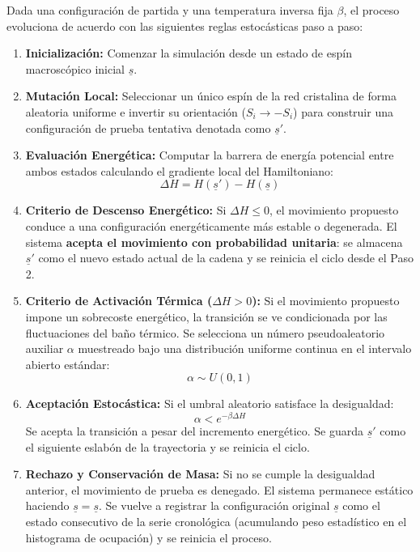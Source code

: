 \begin{teo}
Dada una configuración de partida y una temperatura inversa fija $\beta$, el proceso evoluciona de acuerdo con las siguientes reglas estocásticas paso a paso:
\begin{enumerate}
    \item[\textbf{\color{red}1)}] \textbf{Inicialización:} Comenzar la simulación desde un estado de espín macroscópico inicial $\underline{s}$.
    
    \item[\textbf{\color{red}2)}] \textbf{Mutación Local:} Seleccionar un único espín de la red cristalina de forma aleatoria uniforme e invertir su orientación ($S_i \to -S_i$) para construir una configuración de prueba tentativa denotada como $\underline{s}'$.
    
    \item[\textbf{\color{red}3)}] \textbf{Evaluación Energética:} Computar la barrera de energía potencial entre ambos estados calculando el gradiente local del Hamiltoniano:
    \[
    \Delta H = H(\underline{s}') - H(\underline{s})
    \]
    
    \item[\textbf{\color{red}4)}] \textbf{Criterio de Descenso Energético:} Si $\Delta H \le 0$, el movimiento propuesto conduce a una configuración energéticamente más estable o degenerada. El sistema \textbf{acepta el movimiento con probabilidad unitaria}: se almacena $\underline{s}'$ como el nuevo estado actual de la cadena y se reinicia el ciclo desde el Paso 2.
    
    \item[\textbf{\color{red}5)}] \textbf{Criterio de Activación Térmica ($\Delta H > 0$):} Si el movimiento propuesto impone un sobrecoste energético, la transición se ve condicionada por las fluctuaciones del baño térmico. Se selecciona un número pseudoaleatorio auxiliar $\alpha$ muestreado bajo una distribución uniforme continua en el intervalo abierto estándar:
    \[
    \alpha \sim U(0,1)
    \]
    
    \item[\textbf{\color{red}6)}] \textbf{Aceptación Estocástica:} Si el umbral aleatorio satisface la desigualdad:
    \[
    \alpha < e^{-\beta \Delta H}
    \]
    Se acepta la transición a pesar del incremento energético. Se guarda $\underline{s}'$ como el siguiente eslabón de la trayectoria y se reinicia el ciclo.
    
    \item[\textbf{\color{red}7)}] \textbf{Rechazo y Conservación de Masa:} Si no se cumple la desigualdad anterior, el movimiento de prueba es denegado. El sistema permanece estático haciendo $\underline{s} = \underline{s}$. Se vuelve a registrar la configuración original $\underline{s}$ como el estado consecutivo de la serie cronológica (acumulando peso estadístico en el histograma de ocupación) y se reinicia el proceso.
\end{enumerate}
\end{teo}

